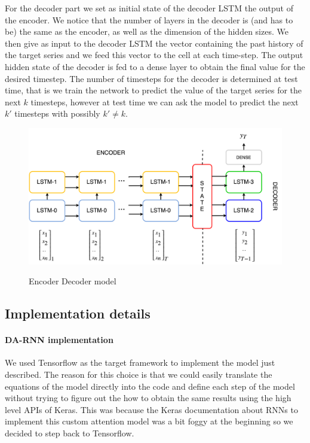 \documentclass{article}
\begin{document}
For the decoder part we set as initial state of the decoder LSTM the output of the
encoder. We notice that the number of layers in the decoder is (and has to be) the
same as the encoder, as well as the dimension of the hidden sizes. We then give as
input to the decoder LSTM the vector containing the past history of the target 
series and we feed this vector to the cell at each time-step. The output hidden
state of the decoder is fed to a dense layer to obtain the final value for the 
desired timestep. The number of timesteps for the decoder is determined at test
time, that is we train the network to predict the value of the target series for
the next $k$ timesteps, however at test time we can ask the model to predict the 
next $k'$ timesteps with possibly $k' \ne k$.

\begin{figure}[ht]
\centering
\includegraphics[width=0.7\linewidth]{img/ende-rnn.png} \\
\caption{Encoder Decoder model}
\label{fig:ende-rnn}
\end{figure}


\subsection{Implementation details}

\paragraph{DA-RNN implementation}

We used Tensorflow as the target framework to implement the model just
described. The reason for this choice is that we
could easily translate the equations of the model directly into the code and
define each step of the model without
trying to figure out the how to obtain the same results using the high level
APIs of Keras. This was because the
Keras documentation about RNNs to implement this custom attention model was a
bit foggy at the beginning so we decided
to step back to Tensorflow. 
\end{document}
